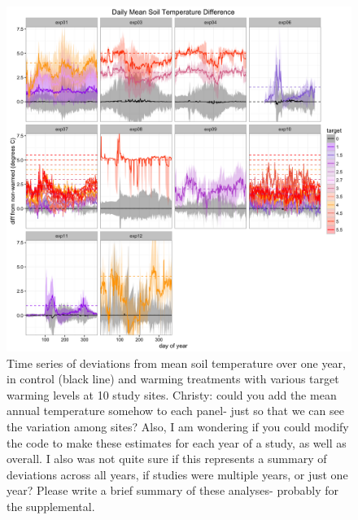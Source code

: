 \documentclass{article}
\begin{document}
\clearpage
\begin{figure}[h]
     \centering
 \includegraphics{../Analyses/figures/Exploratory_TimeSeries_SoilTemp1Mean_Deviation.png}
 \caption{Time series of deviations from mean soil temperature over one year, in control (black line) and warming treatments with various target warming levels at 10 study sites. Christy: could you add the mean annual temperature somehow to each panel- just so that we can see the variation among sites? Also, I am wondering if you could modify the code to make these estimates for each year of a study, as well as overall. I also was not quite sure if this represents a summary of deviations across all years, if studies were multiple years, or just one year? Please write a brief summary of these analyses- probably for the supplemental.}
  \label{fig:effwarm}

 \end{figure}
\end{document}
